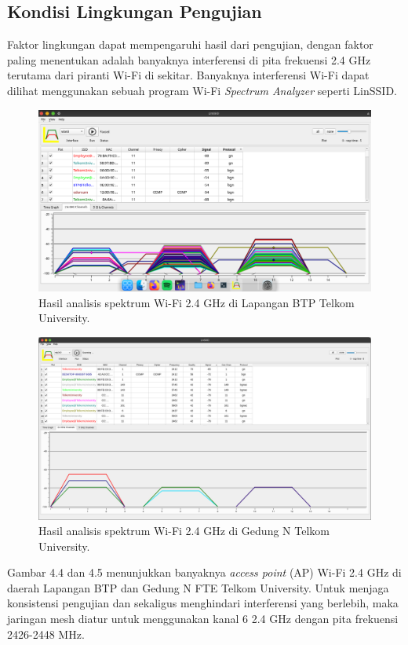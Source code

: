 \subsection{Kondisi Lingkungan Pengujian}
Faktor lingkungan dapat mempengaruhi hasil dari pengujian, dengan faktor paling menentukan adalah banyaknya interferensi di pita frekuensi 2.4 GHz terutama dari piranti Wi-Fi di sekitar. Banyaknya interferensi Wi-Fi dapat dilihat menggunakan sebuah program Wi-Fi \textit{Spectrum Analyzer} seperti LinSSID.
\begin{figure}[H]
	\centering
	\includegraphics[scale=0.25]{./assets/InterferensiLapanganBTP}
	\caption{Hasil analisis spektrum Wi-Fi 2.4 GHz di Lapangan BTP Telkom University.}
\end{figure}
\begin{figure}[H]
	\centering
	\includegraphics[scale=0.2]{./assets/InterferensiGedungN}
	\caption{Hasil analisis spektrum Wi-Fi 2.4 GHz di Gedung N Telkom University.}
\end{figure}
Gambar 4.4 dan 4.5 menunjukkan banyaknya \textit{access point} (AP) Wi-Fi 2.4 GHz di daerah Lapangan BTP dan Gedung N FTE Telkom University. Untuk menjaga konsistensi pengujian dan sekaligus menghindari interferensi yang berlebih, maka jaringan mesh diatur untuk menggunakan kanal 6 2.4 GHz dengan pita frekuensi 2426-2448 MHz.

